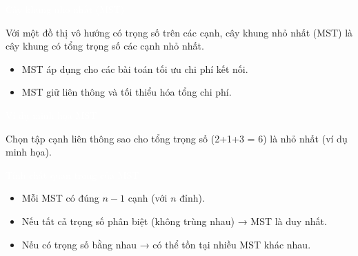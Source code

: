 \documentclass{beamer}
\newcommand{\hlblue}[1]{\textcolor{myblue}{#1}}
\newcommand{\hlgreen}[1]{\textcolor{mygreen}{#1}}
\newcommand{\hlred}[1]{\textcolor{myred}{#1}}
\newcommand{\hlpurple}[1]{\textcolor{mypurple}{#1}}
\newcommand{\hlorange}[1]{\textcolor{myorange}{#1}}
\newcommand{\hlwhite}[1]{\textcolor{white}{#1}}
\begin{document}

\begin{frame}{\hlwhite{Cây khung nhỏ nhất (MST)}}
\begin{tcolorbox}[title=\textbf{\hlgreen{Khái niệm}}]
Với một đồ thị vô hướng có \hlpurple{trọng số} trên các cạnh, \hlblue{cây khung nhỏ nhất (MST)} là cây khung có \hlred{tổng trọng số các cạnh nhỏ nhất}.
\end{tcolorbox}

\begin{itemize}
  \item MST áp dụng cho các bài toán \hlorange{tối ưu chi phí kết nối}.
  \item MST giữ \hlgreen{liên thông} và \hlred{tối thiểu hóa tổng chi phí}.
\end{itemize}
\end{frame}


\begin{frame}{\hlwhite{Ví dụ minh họa MST}}
\centering
{}

\vspace{0.25cm}
\hlpurple{Chọn tập cạnh liên thông sao cho tổng trọng số (2+1+3 = 6) là nhỏ nhất (ví dụ minh họa).}
\end{frame}


\begin{frame}{\hlwhite{Tính chất quan trọng của MST}}
\begin{itemize}
  \item Mỗi MST có đúng \hlred{$n-1$ cạnh} (với \hlblue{$n$ đỉnh}).
  \item Nếu tất cả trọng số \hlgreen{phân biệt} (không trùng nhau) → MST là \hlred{duy nhất}.
  \item Nếu có trọng số \hlorange{bằng nhau} → có thể tồn tại \hlpurple{nhiều MST khác nhau}.
\end{itemize}
\end{frame}
\end{document}
